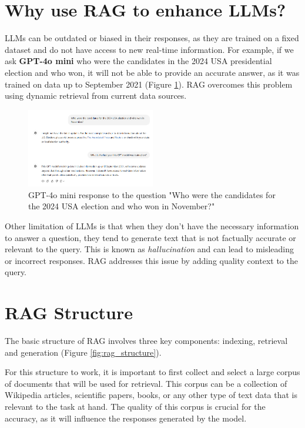 \documentclass[conference]{IEEEtran}
\begin{document}
\section{Why use RAG to enhance LLMs?}
LLMs can be outdated or biased in their responses, as they are trained on a fixed dataset and do not have access to new real-time information.
For example, if we ask \textbf{GPT-4o mini} who were the candidates in the 2024 USA presidential election and who won,
it will not be able to provide an accurate answer, as it was trained on data up to September 2021 (Figure \ref{fig:gpt4o_mini_response}).
RAG overcomes this problem using dynamic retrieval from current data sources.

\begin{figure}[htbp!]
    \centerline{\includegraphics[width=0.5\textwidth]{images/gpt4o_mini_response.png}}
    \caption{GPT-4o mini response to the question "Who were the candidates for the 2024 USA election and who won in November?"}
    \label{fig:gpt4o_mini_response}
\end{figure}

Other limitation of LLMs is that when they don't have the necessary information to answer a question, they tend to generate text
that is not factually accurate or relevant to the query. This is known as \textit{hallucination} and can lead to misleading or incorrect responses.
RAG addresses this issue by adding quality context to the query.

\section{RAG Structure}
The basic structure of RAG involves three key components: indexing, retrieval and generation (Figure \ref{fig:rag_structure}).

For this structure to work, it is important to first collect and select a large
corpus of documents that will be used for retrieval. This corpus can be a collection of
Wikipedia articles, scientific papers, books, or any other type of text data that is relevant to the task at hand.
The quality of this corpus is crucial for the accuracy, as it will influence the responses generated by the model.
\end{document}
